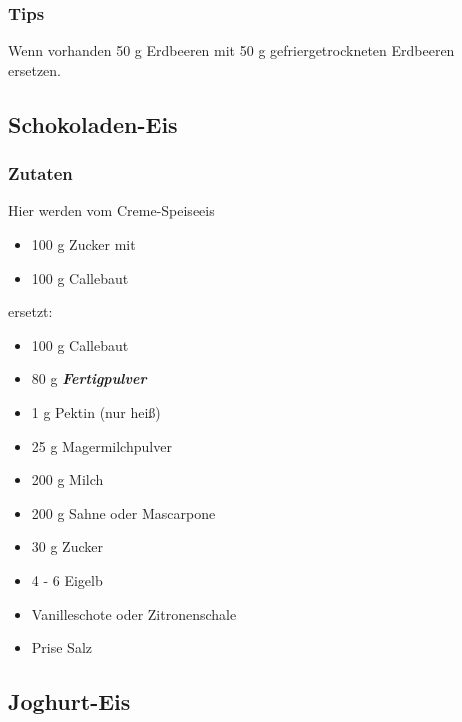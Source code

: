 \documentclass[12pt]{article}
\begin{document}
\subsubsection {Tips}
Wenn vorhanden 50 g Erdbeeren mit 50 g gefriergetrockneten Erdbeeren ersetzen. 


\subsection{Schokoladen-Eis}
\subsubsection {Zutaten}
	Hier werden vom Creme-Speiseeis 
	\begin{itemize}
	  \item 100 g Zucker mit
	  \item 100 g Callebaut
	\end{itemize}
	ersetzt:
	
	\begin{itemize}
		\item 100 g Callebaut
	\end{itemize}
	\begin{itemize}
		\item 80 g \textbf{\textit{Fertigpulver}}
	  	\item 1 g Pektin (nur heiß)
	  	\item 25 g Magermilchpulver
	\end{itemize}
	\begin{itemize}
	  	\item 200 g Milch 
	  	\item 200 g Sahne oder Mascarpone
	  	\item 30 g Zucker
	  	\item 4 - 6 Eigelb %
	  	\item Vanilleschote oder Zitronenschale
	  	\item Prise Salz
	\end{itemize}




\pagebreak
\subsection{Joghurt-Eis}
\end{document}
